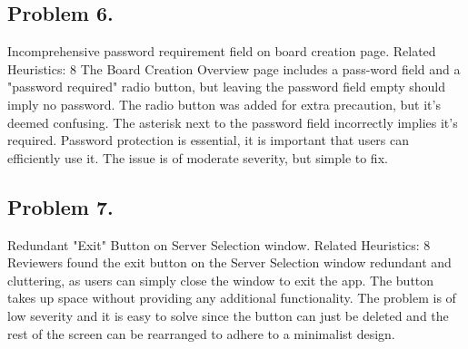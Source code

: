 \subsection*{Problem 6. }
Incomprehensive password requirement field on board creation page.
\newline
Related Heuristics: 8
\newline
\indent The Board Creation Overview page includes a pass-word field and a "password required" radio button, but leaving the password field empty should imply no password. The radio button was added for extra precaution, but it’s deemed confusing. The asterisk next to the password field incorrectly implies it’s required.
\newline
\indent Password protection is essential, it is important that users can efficiently use it. The issue is of moderate severity, but simple to fix.
\newline

\subsection*{Problem 7.}
Redundant "Exit" Button on Server Selection window.
\newline
Related Heuristics: 8
\newline
\indent Reviewers found the exit button on the Server Selection window redundant and cluttering, as users can simply close the window to exit the app. The button takes up space without providing any additional functionality.
\newline
\indent The problem is of low severity and it is easy to solve since the button can just be deleted and the rest of the screen can be rearranged to adhere to a minimalist design.